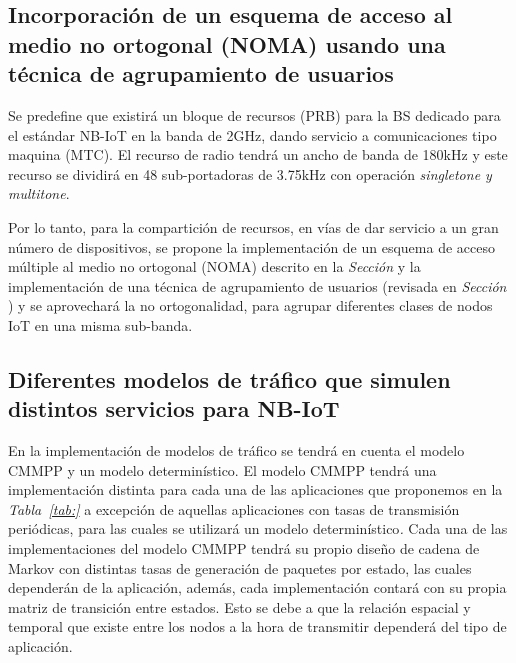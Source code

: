 \subsection{Incorporación de un esquema de acceso al medio no ortogonal (NOMA) usando una técnica de agrupamiento de usuarios}

Se predefine que existirá un bloque de recursos (PRB) para la BS dedicado para el estándar NB-IoT en la banda de 2GHz, dando servicio a comunicaciones tipo maquina (MTC). El recurso de radio tendrá un ancho de banda de 180kHz y este recurso se dividirá en 48 sub-portadoras de 3.75kHz con operación \textit{singletone y multitone}.\newline

Por lo tanto, para la compartición de recursos, en vías de dar servicio a un gran número de dispositivos, se propone la implementación de un esquema de acceso múltiple al medio no ortogonal (NOMA) descrito en la \textit{Sección } y la implementación de una técnica de agrupamiento de usuarios (revisada en \textit{Sección }) y se aprovechará la no ortogonalidad, para agrupar diferentes clases de nodos IoT en una misma sub-banda. \newline

\subsection{Diferentes modelos de tráfico que simulen distintos servicios para NB-IoT}

En la implementación de modelos de tráfico se tendrá en cuenta el modelo CMMPP y un modelo determinístico. El modelo CMMPP tendrá una implementación distinta para cada una de las aplicaciones que proponemos en la \textit{Tabla~\ref{tab:} } a excepción de aquellas aplicaciones con tasas de transmisión periódicas, para las cuales se utilizará un modelo determinístico\textit{.} Cada una de las implementaciones del modelo CMMPP tendrá su propio diseño de cadena de Markov con distintas tasas de generación de paquetes por estado, las cuales dependerán de la aplicación, además, cada implementación contará con su propia matriz de transición entre estados. Esto se debe a que la relación espacial y temporal que existe entre los nodos a la hora de transmitir dependerá del tipo de aplicación.


